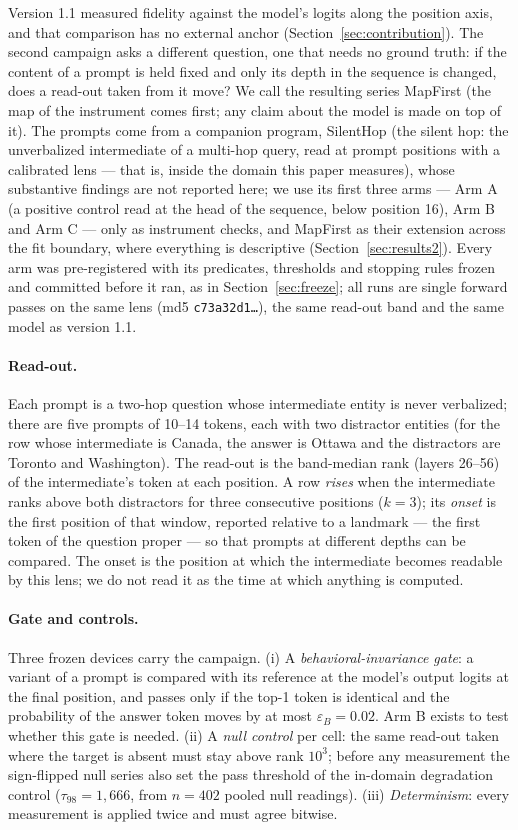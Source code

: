 \documentclass[11pt]{article}
\begin{document}
Version 1.1 measured fidelity against the model's logits along the position axis, and that comparison has no external anchor (Section~\ref{sec:contribution}). The second campaign asks a different question, one that needs no ground truth: if the content of a prompt is held fixed and only its depth in the sequence is changed, does a read-out taken from it move? We call the resulting series MapFirst (the map of the instrument comes first; any claim about the model is made on top of it). The prompts come from a companion program, SilentHop (the silent hop: the unverbalized intermediate of a multi-hop query, read at prompt positions with a calibrated lens --- that is, inside the domain this paper measures), whose substantive findings are not reported here; we use its first three arms --- Arm A (a positive control read at the head of the sequence, below position 16), Arm B and Arm C --- only as instrument checks, and MapFirst as their extension across the fit boundary, where everything is descriptive (Section~\ref{sec:results2}). Every arm was pre-registered with its predicates, thresholds and stopping rules frozen and committed before it ran, as in Section~\ref{sec:freeze}; all runs are single forward passes on the same lens (md5 \texttt{c73a32d1\ldots}), the same read-out band and the same model as version 1.1.

\paragraph{Read-out.} Each prompt is a two-hop question whose intermediate entity is never verbalized; there are five prompts of 10--14 tokens, each with two distractor entities (for the row whose intermediate is Canada, the answer is Ottawa and the distractors are Toronto and Washington). The read-out is the band-median rank (layers 26--56) of the intermediate's token at each position. A row \emph{rises} when the intermediate ranks above both distractors for three consecutive positions ($k = 3$); its \emph{onset} is the first position of that window, reported relative to a landmark --- the first token of the question proper --- so that prompts at different depths can be compared. The onset is the position at which the intermediate becomes readable by this lens; we do not read it as the time at which anything is computed.

\paragraph{Gate and controls.} Three frozen devices carry the campaign. (i) A \emph{behavioral-invariance gate}: a variant of a prompt is compared with its reference at the model's output logits at the final position, and passes only if the top-1 token is identical and the probability of the answer token moves by at most $\varepsilon_B = 0.02$. Arm B exists to test whether this gate is needed. (ii) A \emph{null control} per cell: the same read-out taken where the target is absent must stay above rank $10^3$; before any measurement the sign-flipped null series also set the pass threshold of the in-domain degradation control ($\tau_{98} = 1{,}666$, from $n = 402$ pooled null readings). (iii) \emph{Determinism}: every measurement is applied twice and must agree bitwise.
\end{document}

